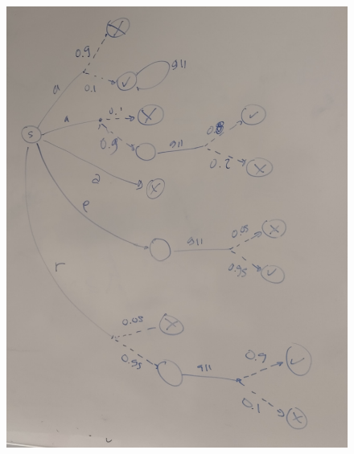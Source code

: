 \begin{figure}[t]
    \begin{center}
        \includegraphics[scale=0.1]{PLTS.jpg}
    \end{center}
\end{figure}



